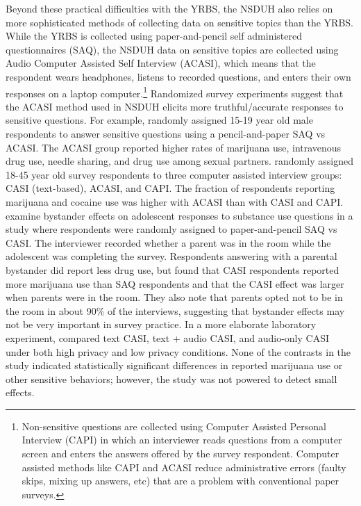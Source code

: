 \documentclass[12pt]{article}%
\begin{document}
Beyond these practical difficulties with the YRBS, the NSDUH also relies on more sophisticated methods of collecting data on sensitive topics than the YRBS. While the YRBS is collected using paper-and-pencil self administered questionnaires (SAQ), the NSDUH data on sensitive topics are collected using Audio Computer Assisted Self Interview (ACASI), which means that the respondent wears headphones, listens to recorded questions, and enters their own responses on a laptop computer.\footnote{Non-sensitive questions are collected using Computer Assisted Personal Interview (CAPI) in which an interviewer reads questions from a computer screen and enters the answers offered by the survey respondent. Computer assisted methods like CAPI and ACASI reduce administrative errors (faulty skips, mixing up answers, etc) that are a problem with conventional paper surveys.} 
%
Randomized survey experiments suggest that the ACASI method used in NSDUH elicits more truthful/accurate responses to sensitive questions. For example, \citet{turner1998adolescent} randomly assigned 15-19 year old male respondents to answer sensitive questions using a pencil-and-paper SAQ vs ACASI. The ACASI group reported higher rates of marijuana use, intravenous drug use, needle sharing, and drug use among sexual partners. \citet{tourangeau1996asking} randomly assigned 18-45 year old survey respondents to three computer assisted interview groups: CASI (text-based), ACASI, and CAPI. The fraction of respondents reporting marijuana and cocaine use was higher with ACASI than with CASI and CAPI. \cite{aquilino2000response} examine bystander effects on adolescent responses to substance use questions in a study where respondents were randomly assigned to paper-and-pencil SAQ vs CASI. The interviewer recorded whether a parent was in the room while the adolescent was completing the survey. Respondents answering with a parental bystander did report less drug use, but \citet{aquilino2000response} found that CASI respondents reported more marijuana use than  SAQ respondents and that the CASI effect was larger when parents were in the room. They also note that parents opted not to be in the room in about 90\% of the interviews, suggesting that bystander effects may not be very important in survey practice. In a more elaborate laboratory experiment, \citet{couper2003understanding} compared text CASI, text + audio CASI, and audio-only CASI under both high privacy and low privacy conditions. None of the contrasts in the study indicated statistically significant differences in reported marijuana use or other sensitive behaviors; however, the study was not powered to detect small effects.
\end{document}
